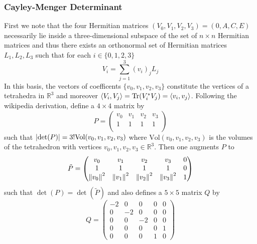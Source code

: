\documentclass[notitlepage, 10pt]{article}
\begin{document}
\subsubsection{Cayley-Menger Determinant}

First we note that the four Hermitian matrices $(V_0,V_1,V_2,V_3) = (0,A,C,E)$ necessarily lie inside a three-dimensional subspace of the set of $n\times n$ Hermitian matrices and thus there exists an orthonormal set of Hermitian matrices $L_1, L_2, L_3$ such that for each $i \in \{0,1,2,3\}$
\begin{equation}
    V_i = \sum_{j=1}^{3} (v_i)_j L_j
\end{equation}
In this basis, the vectors of coefficents $\{v_0, v_1, v_2, v_3\}$ constitute the vertices of a tetrahedra in $\mathbb R^3$ and moreover $\braket{V_i, V_j} = \operatorname{Tr}(V_i^* V_j) = \braket{v_i, v_j}$.
Following the wikipedia derivation, define a $4 \times 4$ matrix by
\begin{equation}
    P = \begin{pmatrix}
        v_0 & v_1 & v_2 & v_3  \\
        1 & 1 & 1 & 1  \\
    \end{pmatrix}
\end{equation}
such that $\left|\det(P)\right| = 3! \mathrm{Vol}(v_0,v_1,v_2,v_3)$ where $\mathrm{Vol}(v_0,v_1,v_2,v_3)$ is the volumes of the tetrahedron with vertices $v_0,v_1,v_2,v_3 \in \mathbb R^3$.
Then one augments $P$ to
\begin{equation}
    \tilde P = \begin{pmatrix}
        v_0 & v_1 & v_2 & v_3 & 0  \\
        1 & 1 & 1 & 1 & 0  \\
        \left\lVert v_0\right\rVert^{2} & \left\lVert v_1\right\rVert^{2} & \left\lVert v_2\right\rVert^{2} & \left\lVert v_3\right\rVert^2 & 1 \\
    \end{pmatrix}
\end{equation}
such that $\det(P) = \det(\tilde P)$ and also defines a $5 \times 5$ matrix $Q$ by
\begin{equation}
    Q = \begin{pmatrix}
        -2 & 0 & 0 & 0 & 0 \\
        0 & -2 & 0 & 0 & 0 \\
        0 & 0 & -2 & 0 & 0 \\
        0 & 0 & 0 & 0 & 1 \\
        0 & 0 & 0 & 1 & 0
    \end{pmatrix}
\end{equation}
\end{document}
